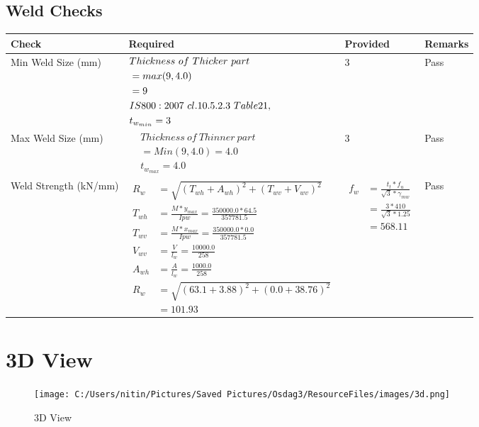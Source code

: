 \documentclass{article}%
\begin{document}
\subsection{Weld Checks}%
\label{subsec:WeldChecks}%
\renewcommand{\arraystretch}{1.2}%
\begin{longtable}{|p{4cm}|p{7.0cm}|p{3.5cm}|p{1.5cm}|}%
\hline%
\rowcolor{OsdagGreen}%
Check&Required&Provided&Remarks\\%
\hline%
\endhead%
\hline%
Min Weld Size (mm)&$\begin{aligned} &Thickness~of~Thicker~part\\ \noindent &=max(9,4.0)\\ &=9\\ &IS800:2007~cl.10.5.2.3~Table 21,\\  &t_{w_{min}}=3\end{aligned}$&3&Pass\\%
\hline%
Max Weld Size (mm)&$\begin{aligned} & Thickness~of~Thinner~part\\ &=Min(9,4.0)=4.0\\ &t_{w_{max}} =4.0\end{aligned}$&3&Pass\\%
\hline%
Weld Strength (kN/mm)&$\begin{aligned} R_w&=\sqrt{(T_{wh}+A_{wh})^2 + (T_{wv}+V_{wv})^2}\\ T_{wh}&=\frac{M*y_{max}}{I{pw}}=\frac{350000.0*64.5}{357781.5}\\ T_{wv}&=\frac{M*x_{max}}{I{pw}}=\frac{350000.0*0.0}{357781.5}\\ V_{wv}&=\frac{V}{l_w}=\frac{10000.0}{258}\\ A_{wh}&=\frac{A}{l_w}=\frac{1000.0}{258}\\ R_w&=\sqrt{(63.1+3.88)^2 + (0.0+38.76)^2}\\ &=101.93\end{aligned}$&$\begin{aligned} f_w &=\frac{t_t*f_u}{\sqrt{3}*\gamma_{mw}}\\ &=\frac{3*410}{\sqrt{3}*1.25}\\ &=568.11\end{aligned}$&Pass\\%
\hline%
\end{longtable}

%
%
\newpage%
\section{3D View}%
\label{sec:3DView}%


\begin{figure}[h!]%
\centering%
\texttt{[image: C:/Users/nitin/Pictures/Saved Pictures/Osdag3/ResourceFiles/images/3d.png]}%
\caption{3D View}%
\end{figure}

%
\end{document}

